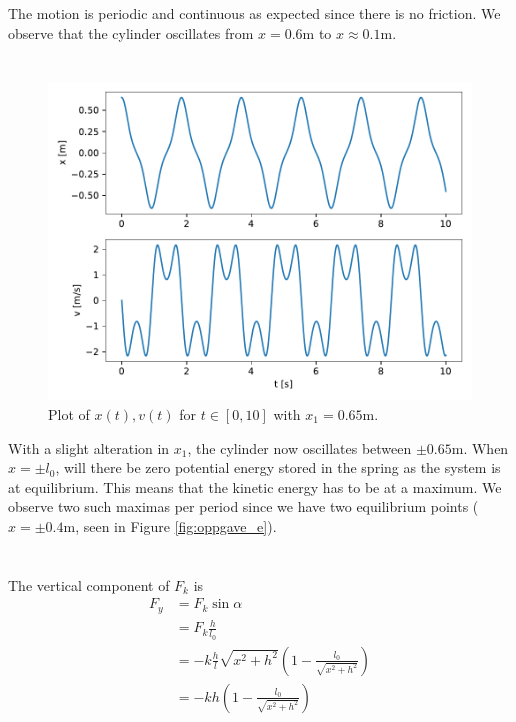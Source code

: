 \documentclass[a4paper,10pt,english]{article}
\begin{document}
The motion is periodic and continuous as expected since there is no friction. We observe that the cylinder oscillates from $x=0.6$m to $x\approx0.1$m.

\section{}
\begin{figure}[h]
    \centering
    \includegraphics[scale=0.55]{figure_g.pdf}
    \caption{Plot of $x(t), v(t)$ for $t\in[0, 10]$ with $x_1=0.65$m.}
    \label{fig:figure_g}
\end{figure}
With a slight alteration in $x_1$, the cylinder now oscillates between $\pm 0.65$m. When $x=\pm l_0$, will there be zero potential energy stored in the spring as the system is at equilibrium. This means that the kinetic energy has to be at a maximum. We observe two such maximas per period since we have two equilibrium points ($x=\pm0.4$m, seen in Figure \ref{fig:oppgave_e}).

\section{}
The vertical component of $F_k$ is
\begin{align*}
    F_y
    &= F_k \sin\alpha \\
    &= F_k \frac{h}{l_0} \\
    &= -k \frac{h}{l} \sqrt{x^2+h^2}
        \left( 
            1 - \frac{l_0}{\sqrt{x^2+h^2}}
        \right) \\
    &= -k h
        \left( 
            1 - \frac{l_0}{\sqrt{x^2+h^2}}
        \right)
\end{align*}
\end{document}
